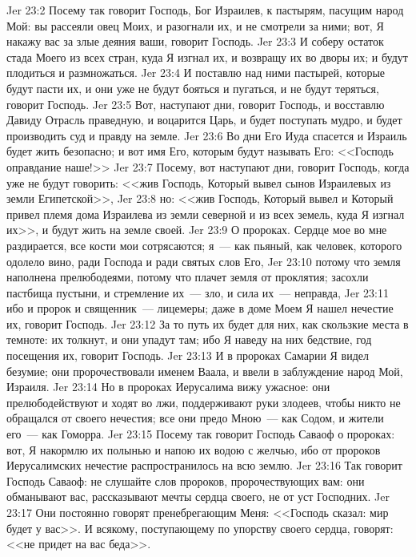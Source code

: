 \vs Jer 23:2 Посему так говорит Господь, Бог Израилев, к пастырям, пасущим народ Мой: вы рассеяли овец Моих, и разогнали их, и не смотрели за ними; вот, Я накажу вас за злые деяния ваши, говорит Господь.
\vs Jer 23:3 И соберу остаток стада Моего из всех стран, куда Я изгнал их, и возвращу их во дворы их; и будут плодиться и размножаться.
\vs Jer 23:4 И поставлю над ними пастырей, которые будут пасти их, и они уже не будут бояться и пугаться, и не будут теряться, говорит Господь.
\rsbpar\vs Jer 23:5 Вот, наступают дни, говорит Господь, и восставлю Давиду Отрасль праведную, и воцарится Царь, и будет поступать мудро, и будет производить суд и правду на земле.
\vs Jer 23:6 Во дни Его Иуда спасется и Израиль будет жить безопасно; и вот имя Его, которым будут называть Его: <<Господь оправдание наше!>>
\vs Jer 23:7 Посему, вот наступают дни, говорит Господь, когда уже не будут говорить: <<жив Господь, Который вывел сынов Израилевых из земли Египетской>>,
\vs Jer 23:8 но: <<жив Господь, Который вывел и Который привел племя дома Израилева из земли северной и из всех земель, куда Я изгнал их>>, и будут жить на земле своей.
\rsbpar\vs Jer 23:9 О пророках. Сердце мое во мне раздирается, все кости мои сотрясаются; я~--- как пьяный, как человек, которого одолело вино, ради Господа и ради святых слов Его,
\vs Jer 23:10 потому что земля наполнена прелюбодеями, потому что плачет земля от проклятия; засохли пастбища пустыни, и стремление их~--- зло, и сила их~--- неправда,
\vs Jer 23:11 ибо и пророк и священник~--- лицемеры; даже в доме Моем Я нашел нечестие их, говорит Господь.
\vs Jer 23:12 За то путь их будет для них, как скользкие места в темноте: их толкнут, и они упадут там; ибо Я наведу на них бедствие, год посещения их, говорит Господь.
\vs Jer 23:13 И в пророках Самарии Я видел безумие; они пророчествовали именем Ваала, и ввели в заблуждение народ Мой, Израиля.
\vs Jer 23:14 Но в пророках Иерусалима вижу ужасное: они прелюбодействуют и ходят во лжи, поддерживают руки злодеев, чтобы никто не обращался от своего нечестия; все они предо Мною~--- как Содом, и жители его~--- как Гоморра.
\vs Jer 23:15 Посему так говорит Господь Саваоф о пророках: вот, Я накормлю их полынью и напою их водою с желчью, ибо от пророков Иерусалимских нечестие распространилось на всю землю.
\vs Jer 23:16 Так говорит Господь Саваоф: не слушайте слов пророков, пророчествующих вам: они обманывают вас, рассказывают мечты сердца своего,  не от уст Господних.
\vs Jer 23:17 Они постоянно говорят пренебрегающим Меня: <<Господь сказал: мир будет у вас>>. И всякому, поступающему по упорству своего сердца, говорят: <<не придет на вас беда>>.
